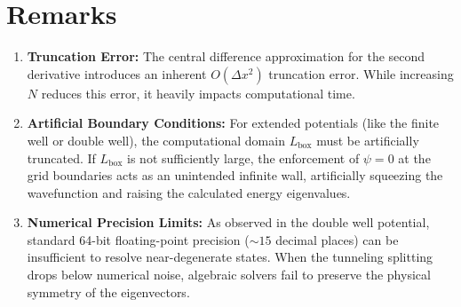 \documentclass[12pt, a4paper, twoside]{article}
\begin{document}
        
    \section{Remarks}
    \begin{enumerate}
        \item {\bf Truncation Error: } The central difference approximation for the second derivative introduces an inherent $O(\Delta x^2)$ truncation error. While increasing $N$ reduces this error, it heavily impacts computational time.
        \item {\bf Artificial Boundary Conditions: } For extended potentials (like the finite well or double well), the computational domain $L_{\text{box}}$ must be artificially truncated. If $L_{\text{box}}$ is not sufficiently large, the enforcement of $\psi = 0$ at the grid boundaries acts as an unintended infinite wall, artificially squeezing the wavefunction and raising the calculated energy eigenvalues.
        \item {\bf Numerical Precision Limits: } As observed in the double well potential, standard 64-bit floating-point precision ($\sim 15$ decimal places) can be insufficient to resolve near-degenerate states. When the tunneling splitting drops below numerical noise, algebraic solvers fail to preserve the physical symmetry of the eigenvectors.
    \end{enumerate}
\end{document}
